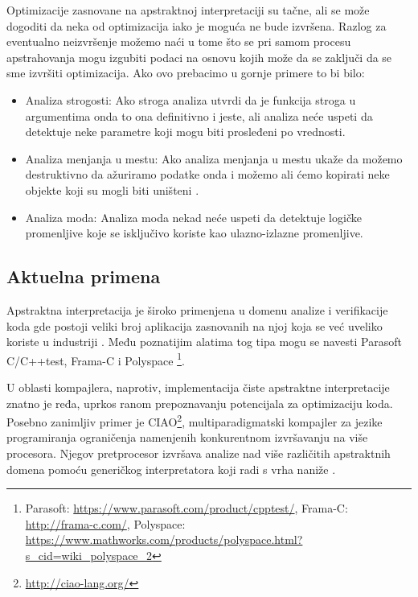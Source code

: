Optimizacije zasnovane na apstraktnoj interpretaciji su tačne, ali se može dogoditi da neka od optimizacija iako je moguća ne bude izvršena. Razlog za eventualno neizvršenje možemo naći u tome što se pri samom procesu apstrahovanja mogu izgubiti podaci na osnovu kojih može da se zaključi da se sme izvršiti optimizacija. Ako ovo prebacimo u gornje primere to bi bilo:




\begin{itemize}
\item Analiza strogosti:
Ako stroga analiza utvrdi da je funkcija stroga u argumentima onda to ona definitivno i jeste, ali analiza neće uspeti da detektuje neke parametre koji mogu biti prosleđeni po vrednosti. 

\item Analiza menjanja u mestu:
Ako analiza menjanja u mestu ukaže da možemo destruktivno da ažuriramo podatke onda i možemo ali ćemo kopirati neke objekte koji su mogli biti uništeni \cite{Girard1987}. 


\item Analiza moda:
Analiza moda nekad neće uspeti da detektuje logičke promenljive koje se isključivo koriste kao ulazno-izlazne promenljive. 

\end{itemize}

\subsection{Aktuelna primena}
Apstraktna interpretacija je široko primenjena u domenu analize i verifikacije koda gde postoji veliki broj aplikacija zasnovanih na njoj koja se već uveliko koriste u industriji \cite{Wilhelm-Wachter}. Među poznatijim alatima tog tipa mogu se navesti Parasoft C/C++test, Frama-C i Polyspace \footnote{Parasoft: \url{https://www.parasoft.com/product/cpptest/}, Frama-C: \url{http://frama-c.com/}, Polyspace: \url{https://www.mathworks.com/products/polyspace.html?s_cid=wiki_polyspace_2}}. 

U oblasti kompajlera, naprotiv, implementacija čiste apstraktne interpretacije znatno je ređa, uprkos ranom prepoznavanju potencijala za optimizaciju koda\cite{cousot}. 	Posebno zanimljiv primer je CIAO\footnote{\url{http://ciao-lang.org/}}, multiparadigmatski kompajler za jezike programiranja ograničenja namenjenih konkurentnom izvršavanju na više procesora. Njegov pretprocesor izvršava analize nad više različitih apstraktnih domena pomo\-ću generičkog interpretatora koji radi 	s vrha naniže \cite{ciao-report}. 

